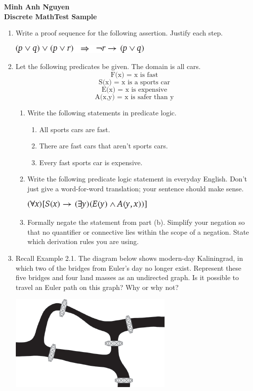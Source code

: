 \documentclass[12pt]{article}
\begin{document}
\textbf{Minh Anh Nguyen }\\
\textbf{Discrete Math\hfill Test Sample}

\hrulefill

\begin{enumerate}
  \item Write a proof sequence for the following assertion. Justify each step.
        \begin{center}
            \includegraphics[scale=2.5]{img/img-0.png}
        \end{center}
  \item Let the following predicates be given. The domain is all cars.
  \[\text{F(x) = x is fast}\]
  \[\text{S(x) = x is a sports car}\]
  \[\text{E(x) = x is expensive}\]
  \[\text{A(x,y) = x is safer than y}\]
        \begin{enumerate}
            \item Write the following statements in predicate logic.
            \begin{enumerate}
                \item All sports cars are fast.
                \item There are fast cars that aren’t sports cars.
                \item Every fast sports car is expensive.
            \end{enumerate}
            \item Write the following predicate logic statement in everyday English. Don’t just give a word-for-word translation; your sentence should make sense.
            \begin{center}
                \includegraphics[scale=2.5]{img/img-1.png}
            \end{center}
            \item Formally negate the statement from part (b). Simplify your negation so that no quantifier or connective lies within the scope of a negation. State which derivation rules you are using.
        \end{enumerate}
    \item Recall Example 2.1. The diagram below shows modern-day Kaliningrad, in which two of the bridges from Euler’s day no longer exist. Represent these five bridges and four land masses as an undirected graph. Is it possible to travel an Euler path on this graph? Why or why not?
    \begin{center}
        \includegraphics[scale=2.5]{img/img-3.png}
    \end{center}


\end{enumerate}
\end{document}
